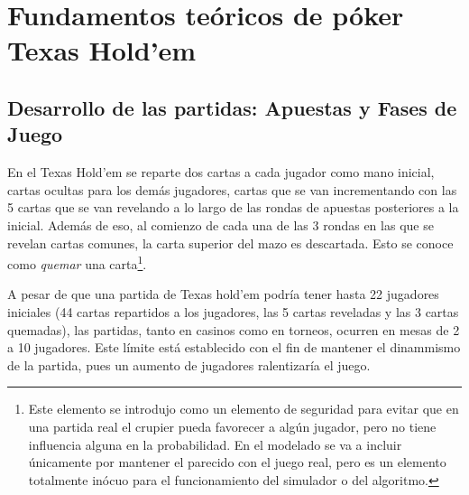 \section{Fundamentos teóricos de póker Texas Hold'em}
\subsection{Desarrollo de las partidas: Apuestas y Fases de Juego}

En el Texas Hold'em\cite{howto} se reparte dos cartas a cada jugador como mano inicial, cartas ocultas para los demás jugadores, cartas que se van incrementando con las 5 cartas que se van revelando a lo largo de las rondas de apuestas posteriores a la inicial. Además de eso, al comienzo de cada una de las 3 rondas en las que se revelan cartas comunes, la carta superior del mazo es descartada. Esto se conoce como \textit{quemar} una carta\footnote{Este elemento se introdujo como un elemento de seguridad para evitar que en una partida real el crupier pueda favorecer a algún jugador, pero no tiene influencia alguna en la probabilidad. En el modelado se va a incluir únicamente por mantener el parecido con el juego real, pero es un elemento totalmente inócuo para el funcionamiento del simulador o del algoritmo.}. 

A pesar de que una partida de Texas hold’em podría tener hasta 22 jugadores iniciales (44 cartas repartidos a los jugadores, las 5 cartas reveladas y las 3 cartas quemadas), las partidas, tanto en casinos como en torneos, ocurren en mesas de 2 a 10 jugadores. Este límite está establecido con el fin de mantener el dinammismo de la partida, pues un aumento de jugadores ralentizaría el juego.

